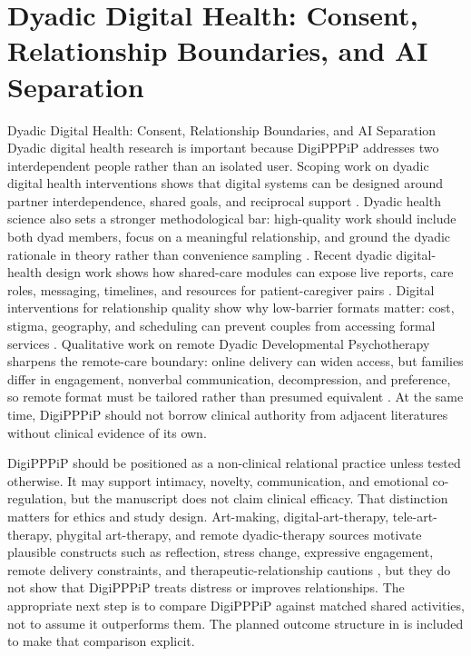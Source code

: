 \documentclass[
  ignorenonframetext,
]{beamer}
\author{\texorpdfstring{}{}}
\date{}
\begin{document}
\section{Dyadic Digital Health: Consent, Relationship Boundaries, and AI
Separation}\label{sec:health}

\begin{frame}[allowframebreaks]{Dyadic Digital Health: Consent,
Relationship Boundaries, and AI Separation}
Dyadic digital health research is important because DigiPPPiP addresses
two interdependent people rather than an isolated user. Scoping work on
dyadic digital health interventions shows that digital systems can be
designed around partner interdependence, shared goals, and reciprocal
support . Dyadic health science also sets a
stronger methodological bar: high-quality work should include both dyad
members, focus on a meaningful relationship, and ground the dyadic
rationale in theory rather than convenience sampling
. Recent dyadic digital-health design work
shows how shared-care modules can expose live reports, care roles,
messaging, timelines, and resources for patient-caregiver pairs
. Digital interventions for
relationship quality show why low-barrier formats matter: cost, stigma,
geography, and scheduling can prevent couples from accessing formal
services . Qualitative work on remote
Dyadic Developmental Psychotherapy sharpens the remote-care boundary:
online delivery can widen access, but families differ in engagement,
nonverbal communication, decompression, and preference, so remote format
must be tailored rather than presumed equivalent
. At the same time, DigiPPPiP should not borrow
clinical authority from adjacent literatures without clinical evidence
of its own.

DigiPPPiP should be positioned as a non-clinical relational practice
unless tested otherwise. It may support intimacy, novelty,
communication, and emotional co-regulation, but the manuscript does not
claim clinical efficacy. That distinction matters for ethics and study
design. Art-making, digital-art-therapy, tele-art-therapy, phygital
art-therapy, and remote dyadic-therapy sources motivate plausible
constructs such as reflection, stress change, expressive engagement,
remote delivery constraints, and therapeutic-relationship cautions
, but
they do not show that DigiPPPiP treats distress or improves
relationships. The appropriate next step is to compare DigiPPPiP against
matched shared activities, not to assume it outperforms them. The
planned outcome structure in  is
included to make that comparison explicit.


\end{frame}
\end{document}
